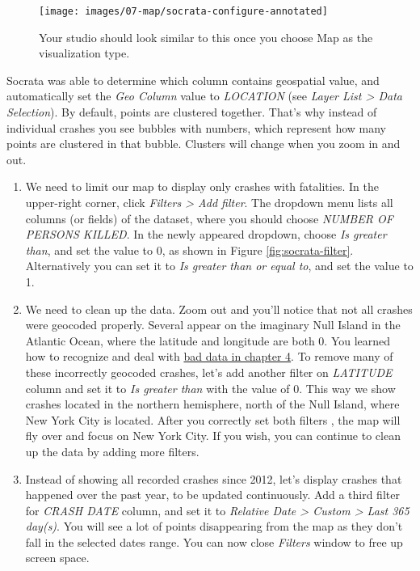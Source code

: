 \documentclass[
  english,
]{book}
\begin{document}
\begin{figure}
\texttt{[image: images/07-map/socrata-configure-annotated]} \caption{Your studio should look similar to this once you choose Map as the visualization type.}\label{fig:socrata-configure}
\end{figure}

Socrata was able to determine which column contains geospatial value, and automatically set the \emph{Geo Column} value to \emph{LOCATION} (see \emph{Layer List \textgreater{} Data Selection}). By default, points are clustered together. That's why instead of individual crashes you see bubbles with numbers, which represent how many points are clustered in that bubble. Clusters will change when you zoom in and out.

\begin{enumerate}
\def\labelenumi{\arabic{enumi}.}
\setcounter{enumi}{3}
\item
  We need to limit our map to display only crashes with fatalities. In the upper-right corner, click \emph{Filters \textgreater{} Add filter}. The dropdown menu lists all columns (or fields) of the dataset, where you should choose \emph{NUMBER OF PERSONS KILLED}. In the newly appeared dropdown, choose \emph{Is greater than}, and set the value to 0, as shown in Figure \ref{fig:socrata-filter}. Alternatively you can set it to \emph{Is greater than or equal to}, and set the value to 1.
\item
  We need to clean up the data. Zoom out and you'll notice that not all crashes were geocoded properly. Several appear on the imaginary Null Island in the Atlantic Ocean, where the latitude and longitude are both 0. You learned how to recognize and deal with \href{bad-data.html}{bad data in chapter 4}. To remove many of these incorrectly geocoded crashes, let's add another filter on \emph{LATITUDE} column and set it to \emph{Is greater than} with the value of 0. This way we show crashes located in the northern hemisphere, north of the Null Island, where New York City is located. After you correctly set both filters , the map will fly over and focus on New York City. If you wish, you can continue to clean up the data by adding more filters.
\item
  Instead of showing all recorded crashes since 2012, let's display crashes that happened over the past year, to be updated continuously. Add a third filter for \emph{CRASH DATE} column, and set it to \emph{Relative Date \textgreater{} Custom \textgreater{} Last 365 day(s)}. You will see a lot of points disappearing from the map as they don't fall in the selected dates range. You can now close \emph{Filters} window to free up screen space.
\end{enumerate}
\end{document}
